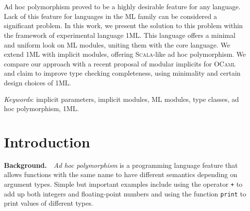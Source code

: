 \documentclass{spbau-diploma}
\begin{document}
\maketitle
\tableofcontents
\section*{}

Ad hoc polymorphism proved to be a highly desirable feature for any language. Lack of this feature for languages in the \textsc{ML} family can be considered a significant problem. In this work, we present the solution to this problem within the framework of experimental language \textsc{1ML}. This language offers a minimal and uniform look on \textsc{ML} modules, uniting them with the core language. We extend \textsc{1ML} with implicit modules, offering \textsc{Scala}-like ad hoc polymorphism. We compare our approach with a recent proposal of modular implicits for \textsc{OCaml} and claim to improve type checking completeness, using minimality and certain design choices of \textsc{1ML}.

\textit{Keywords}: implicit parameters, implicit modules, \textsc{ML} modules, type classes, ad hoc polymorphism, \textsc{1ML}.

\section{Introduction}

\textbf{Background.}~~\textit{Ad hoc polymorphism} is a programming language feature that allows functions with the same name to have different semantics depending on argument types. Simple but important examples include using the operator \texttt{+} to add up both integers and floating-point numbers and using the function \texttt{print} to print values of different types.
\end{document}
